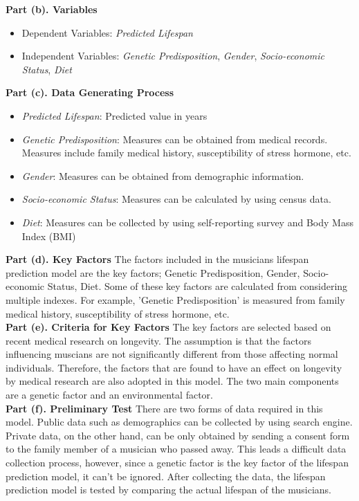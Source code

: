 \documentclass[letterpaper,12pt]{article}
\theoremstyle{definition}
\begin{document}
\noindent\textbf{Part (b). Variables}
\begin{itemize}
\item Dependent Variables: \textit{Predicted Lifespan}
\item Independent Variables: \textit{Genetic Predisposition}, \textit{Gender}, \textit{Socio-economic Status}, \textit{Diet}\\
\end{itemize}

\noindent\textbf{Part (c). Data Generating Process}
\begin{itemize}
\item \textit{Predicted Lifespan}: Predicted value in years
\item \textit{Genetic Predisposition}: Measures can be obtained from medical records. Measures include family medical history, susceptibility of stress hormone, etc.
\item \textit{Gender}: Measures can be obtained from demographic information.
\item \textit{Socio-economic Status}: Measures can be calculated by using census data.
\item \textit{Diet}: Measures can be collected by using self-reporting survey and Body Mass Index (BMI)\\
\end{itemize}

\noindent\textbf{Part (d). Key Factors}
The factors included in the musicians lifespan prediction model are the key factors; Genetic Predisposition, Gender, Socio-economic Status, Diet. Some of these key factors are calculated from considering multiple indexes. For example, 'Genetic Predisposition' is measured from family medical history, susceptibility of stress hormone, etc.\\

\noindent\textbf{Part (e). Criteria for Key Factors}
The key factors are selected based on recent medical research on longevity. The assumption is that the factors influencing muscians are not significantly different from those affecting normal individuals. Therefore, the factors that are found to have an effect on longevity by medical research are also adopted in this model. The two main components are a genetic factor and an environmental factor.\\

\noindent\textbf{Part (f). Preliminary Test}
There are two forms of data required in this model. Public data such as demographics can be collected by using search engine. Private data, on the other hand, can be only obtained by sending a consent form to the family member of a musician who passed away. This leads a difficult data collection process, however, since a genetic factor is the key factor of the lifespan prediction model, it can't be ignored. After collecting the data, the lifespan prediction model is tested by comparing the actual lifespan of the musicians.\\

\newline
\clearpage

\end{document}
